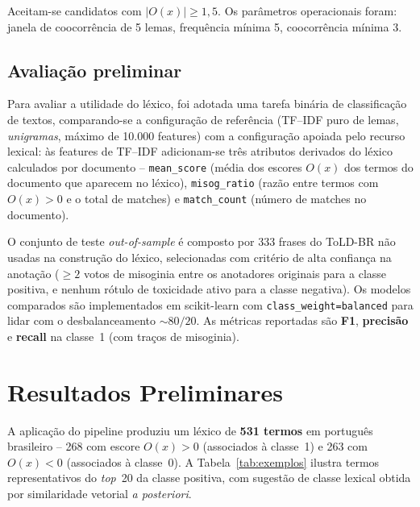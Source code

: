 \documentclass[12pt]{article}
\begin{document}
Aceitam-se candidatos com $|O(x)| \geq 1{,}5$. Os par\^ametros
operacionais foram: janela de coocorr\^encia de 5 lemas, frequ\^encia
m\'inima 5, coocorr\^encia m\'inima 3.

\subsection{Avalia\c{c}\~ao preliminar}

Para avaliar a utilidade do l\'exico, foi adotada uma tarefa bin\'aria
de classifica\c{c}\~ao de textos, comparando-se a configura\c{c}\~ao de
refer\^encia (TF--IDF puro de lemas, \emph{unigramas}, m\'aximo de 10.000
features) com a configura\c{c}\~ao apoiada pelo recurso lexical: \`as
features de TF--IDF adicionam-se tr\^es atributos derivados do l\'exico
calculados por documento -- \texttt{mean\_score} (m\'edia dos escores
$O(x)$ dos termos do documento que aparecem no l\'exico),
\texttt{misog\_ratio} (raz\~ao entre termos com $O(x) > 0$ e o total de
matches) e \texttt{match\_count} (n\'umero de matches no documento).

O conjunto de teste \emph{out-of-sample} \'e composto por 333 frases do
ToLD-BR n\~ao usadas na constru\c{c}\~ao do l\'exico, selecionadas com
crit\'erio de alta confian\c{c}a na anota\c{c}\~ao (\(\geq 2\) votos de
misoginia entre os anotadores originais para a classe positiva, e nenhum
r\'otulo de toxicidade ativo para a classe negativa). Os modelos
comparados s\~ao implementados em scikit-learn \cite{pedregosa2011sklearn}
com \texttt{class\_weight=\textquotesingle balanced\textquotesingle} para
lidar com o desbalanceamento $\sim 80/20$. As m\'etricas reportadas s\~ao
\textbf{F1}, \textbf{precis\~ao} e \textbf{recall} na classe~1 (com
tra\c{c}os de misoginia).

\section{Resultados Preliminares}

A aplica\c{c}\~ao do pipeline produziu um l\'exico de \textbf{531 termos}
em portugu\^es brasileiro -- 268 com escore $O(x) > 0$ (associados \`a
classe~1) e 263 com $O(x) < 0$ (associados \`a classe~0). A
Tabela~\ref{tab:exemplos} ilustra termos representativos do
\emph{top}~20 da classe positiva, com sugest\~ao de classe lexical
obtida por similaridade vetorial \emph{a posteriori}.
\end{document}
